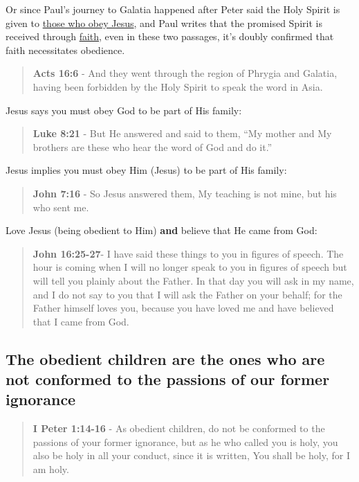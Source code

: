\documentclass[11pt]{article}
\begin{document}
Or since Paul's journey to Galatia happened after Peter said the Holy Spirit is given to \uline{those who obey Jesus}, and Paul writes that the promised Spirit is received through \uline{faith}, even in these two passages, it's doubly confirmed that faith necessitates obedience.

\begin{quote}
\textbf{Acts 16:6} - And they went through the region of Phrygia and Galatia, having been forbidden by the Holy Spirit to speak the word in Asia.
\end{quote}

Jesus says you must obey God to be part of His family:

\begin{quote}
\textbf{Luke 8:21} - But He answered and said to them, “My mother and My brothers are these who hear the word of God and do it.”
\end{quote}

Jesus implies you must obey Him (Jesus) to be part of His family:

\begin{quote}
\textbf{John 7:16} - So Jesus answered them, My teaching is not mine, but his who sent me.
\end{quote}

Love Jesus (being obedient to Him) \textbf{and} believe that He came from God:

\begin{quote}
\textbf{John 16:25-27}- I have said these things to you in figures of speech. The hour is coming when I will no longer speak to you in figures of speech but will tell you plainly about the Father. In that day you will ask in my name, and I do not say to you that I will ask the Father on your behalf; for the Father himself loves you, because you have loved me and have believed that I came from God.
\end{quote}

\subsection{The obedient children are the ones who are not conformed to the passions of our former ignorance}
\label{sec:org7649877}
\begin{quote}
\textbf{I Peter 1:14-16} - As obedient children, do not be conformed to the passions of your former ignorance, but as he who called you is holy, you also be holy in all your conduct, since it is written, You shall be holy, for I am holy.
\end{quote}
\end{document}
